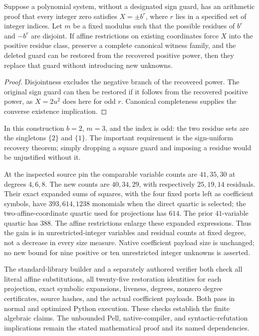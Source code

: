\begin{proposition}
Suppose a polynomial system, without a designated sign guard, has an
arithmetic proof that every integer zero satisfies $X=\pm b^r$, where
$r$ lies in a specified set of integer indices.  Let $m$ be a fixed modulus
such that the possible residues of $b^r$ and $-b^r$ are disjoint.  If
affine restrictions on existing coordinates force $X$ into the positive
residue class, preserve a complete canonical witness family, and the
deleted guard can be restored from the recovered positive power, then
they replace that guard without introducing new unknowns.
\end{proposition}
\begin{proof}
Disjointness excludes the negative branch of the recovered power.
The original sign guard can then be restored if it follows from the
recovered positive power, as $X=2u^2$ does here for odd $r$.
Canonical completeness supplies the converse existence implication.
\end{proof}

In this construction $b=2$, $m=3$, and the index is odd: the two residue
sets are the singletons $\{2\}$ and $\{1\}$.  The important requirement
is the sign-uniform recovery theorem; simply dropping a square guard
and imposing a residue would be unjustified without it.

At the inspected source pin the comparable variable counts are
$41,35,30$ at degrees $4,6,8$.  The new counts are $40,34,29$,
with respectively $25,19,14$ residuals.  Their exact expanded sums of
squares, with the four fixed ports left as coefficient symbols, have
$393,614,1238$ monomials when the direct quartic is selected; the
two-affine-coordinate quartic used for projections has $614$.
The prior $41$-variable quartic has $388$.
The affine restrictions enlarge these expanded
expressions.  Thus the gain is in unrestricted-integer variables and
residual counts at fixed degree, not a decrease in every size measure.
Native coefficient payload size is unchanged; no new bound for nine
positive or ten unrestricted integer unknowns is asserted.

The standard-library builder and a separately authored verifier both check
all literal affine substitutions, all twenty-five restoration identities
for each projection, exact symbolic expansions, liveness, degrees,
nonzero degree certificates, source hashes, and the actual coefficient
payloads.  Both pass in normal and optimized Python execution.  These
checks establish the finite algebraic claims.  The unbounded Pell,
native-compiler, and syntactic-refutation implications remain the stated
mathematical proof and its named dependencies.
